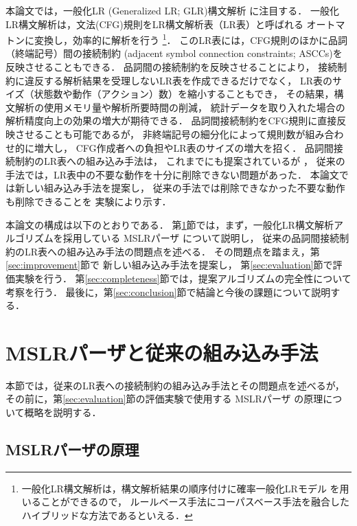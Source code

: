 \documentclass[japanese]{jnlp_1.4}
\begin{document}
本論文では，一般化LR (Generalized LR; GLR)構文解析 \cite{deremer:82,aho:86,tomita:91} に注目する．
一般化LR構文解析は，文法(CFG)規則をLR構文解析表（LR表）と呼ばれる
オートマトンに変換し，効率的に解析を行う
\footnote{一般化LR構文解析は，構文解析結果の順序付けに確率一般化LRモデル
  \cite{inui:00,briscoe:93,charniak:96,jelinek:98}
  を用いることができるので，
  ルールベース手法にコーパスベース手法を融合した
  ハイブリッドな方法であるといえる．}．
このLR表には，CFG規則のほかに品詞（終端記号）間の接続制約
(adjacent symbol connection constraints; ASCCs)を反映させることもできる．
品詞間の接続制約を反映させることにより，
接続制約に違反する解析結果を受理しないLR表を作成できるだけでなく，
LR表のサイズ（状態数や動作（アクション）数）を縮小することもでき，
その結果，構文解析の使用メモリ量や解析所要時間の削減，
統計データを取り入れた場合の解析精度向上の効果の増大が期待できる．
品詞間接続制約をCFG規則に直接反映させることも可能であるが，
非終端記号の細分化によって規則数が組み合わせ的に増大し，
CFG作成者への負担やLR表のサイズの増大を招く．
品詞間接続制約のLR表への組み込み手法は，
これまでにも提案されているが \cite{tanaka:95,li:95}，
従来の手法では，LR表中の不要な動作を十分に削除できない問題があった．
本論文では新しい組み込み手法を提案し，
従来の手法では削除できなかった不要な動作も削除できることを
実験により示す．

本論文の構成は以下のとおりである．
第\ref{sec:mslr}節では，まず，一般化LR構文解析アルゴリズムを採用している
MSLRパーザ \cite{shirai:00} について説明し，
従来の品詞間接続制約のLR表への組み込み手法の問題点を述べる．
その問題点を踏まえ，第\ref{sec:improvement}節で
新しい組み込み手法を提案し，
第\ref{sec:evaluation}節で評価実験を行う．
第\ref{sec:completeness}節では，提案アルゴリズムの完全性について
考察を行う．
最後に，第\ref{sec:conclusion}節で結論と今後の課題について説明する．




\section{MSLRパーザと従来の組み込み手法}
\label{sec:mslr}

本節では，従来のLR表への接続制約の組み込み手法とその問題点を述べるが，
その前に，第\ref{sec:evaluation}節の評価実験で使用する
MSLRパーザ \cite{shirai:00} の原理について概略を説明する．


\subsection{MSLRパーザの原理}
\label{sec:principle}
\end{document}
